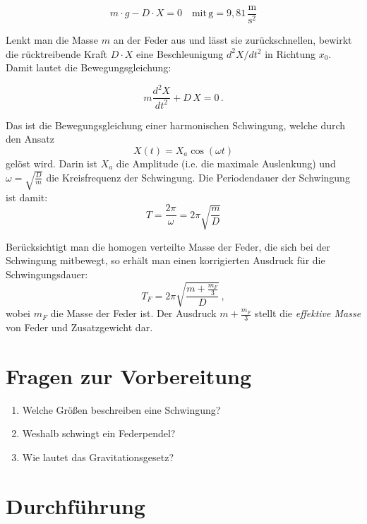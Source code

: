 \begin{equation} \label{eq:Federkonstante}
	m\cdot g - D\cdot X = 0 \quad \mathrm{mit\, g=9,81\,\frac{m}{s^2}}
\end{equation}

Lenkt man die Masse $m$ an der Feder aus und lässt sie zurückschnellen, bewirkt die rücktreibende Kraft $D\cdot X$ eine Beschleunigung $d^2X/dt^2$ in Richtung $x_0$. Damit lautet die Bewegungsgleichung:

\begin{equation}
	m\frac{d^2X}{dt^2} + D\,X = 0 \,.
\end{equation}

Das ist die Bewegungsgleichung einer harmonischen Schwingung, welche durch den Ansatz
\begin{equation}
	X(t) = X_a \cos(\omega t)
\end{equation}
gelöst wird. Darin ist $X_a$ die Amplitude (i.e. die maximale Auslenkung) und $\omega = \sqrt{\frac{D}{m}}$ die Kreisfrequenz der Schwingung. Die Periodendauer der Schwingung ist damit:
\begin{equation}
	T = \frac{2\pi}{\omega} = 2\pi\sqrt{\frac{m}{D}}
\end{equation}

Berücksichtigt man die homogen verteilte Masse der Feder, die sich bei der Schwingung mitbewegt, so erhält man einen korrigierten Ausdruck für die Schwingungsdauer:
\begin{equation} \label{eq:Schwingungsdauer}
	T_F = 2\pi\sqrt{\frac{m+\frac{m_F}{3}}{D}} \, ,
\end{equation}
wobei $m_F$ die Masse der Feder ist. Der Ausdruck $m+\frac{m_F}{3}$ stellt die \textit{effektive Masse} von Feder und Zusatzgewicht dar.
\section{Fragen zur Vorbereitung}

\begin{enumerate} 
	\item Welche Größen beschreiben eine Schwingung?
	\item Weshalb schwingt ein Federpendel?
  \item Wie lautet das Gravitationsgesetz?
\end{enumerate} 

\section{Durchführung} 

